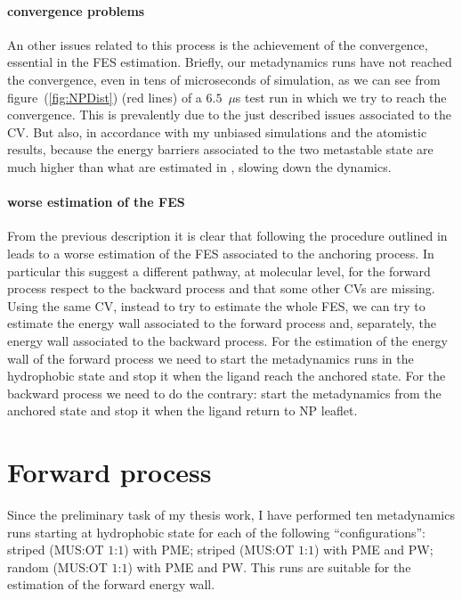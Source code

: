 \paragraph{\textbf{convergence problems}} An other issues related to this process is the achievement of the convergence, essential in the \ac{FES} estimation. Briefly, our metadynamics runs have not reached the convergence, even in tens of microseconds of simulation, as we can see from figure~(\ref{fig:NPDist}) (red lines) of a $6.5$~$\mu$s test run in which we try to reach the convergence. This is prevalently due to the just described issues associated to the \ac{CV}. But also, in accordance with my unbiased simulations and the atomistic results, because the energy barriers associated to the two metastable state are much higher than what are estimated in \cite{ourPaper}, slowing down the dynamics. 

\paragraph{\textbf{worse estimation of the FES}} From the previous description it is clear that following the procedure outlined in \cite{ourPaper} leads to a worse estimation of the \ac{FES} associated to the anchoring process. In particular this suggest a different pathway, at molecular level, for the forward process respect to the backward process and that some other \acp{CV} are missing. Using the same \ac{CV}, instead to try to estimate the whole \ac{FES}, we can try to estimate the energy wall associated to the forward process and, separately, the energy wall associated to the backward process. For the estimation of the energy wall of the forward process we need to start the metadynamics runs in the hydrophobic state and stop it when the ligand reach the anchored state. For the backward process we need to do the contrary: start the metadynamics from the anchored state and stop it when the ligand return to \ac{NP} leaflet.

\section{Forward process}
Since the preliminary task of my thesis work, I have performed ten metadynamics runs starting at hydrophobic state for each of the following ``configurations'': striped (\ac{MUS}:\ac{OT} $1$:$1$) with \ac{PME}; striped (\ac{MUS}:\ac{OT} $1$:$1$) with \ac{PME} and \ac{PW}; random (\ac{MUS}:\ac{OT} $1$:$1$) with \ac{PME} and \ac{PW}. This runs are suitable for the estimation of the forward energy wall.


